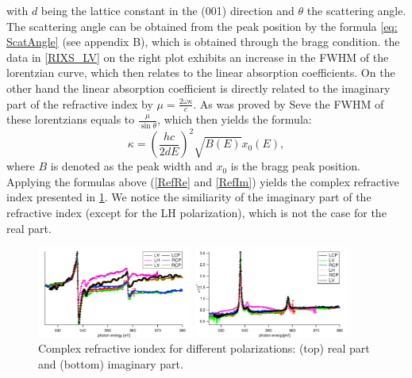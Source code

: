 \documentclass[twocolumn,amsmath,superscriptaddress,amssymb]{revtex4-1}
\begin{document}
\noindent with $d$ being the lattice constant in the (001) direction and $\theta$ the scattering angle. The scattering angle can be obtained from the peak position by the formula \ref{eq: ScatAngle} (see appendix B), which is obtained through the bragg condition. the data in \ref{RIXS_LV} on the right plot exhibits an increase in the FWHM of the lorentzian curve, which then relates to the linear absorption coefficients. On the other hand the linear absorption coefficient is directly related to the imaginary part of the refractive index by 
$\mu=\frac{2\omega\kappa}{c}$. As was proved by Seve \cite{Seve} the FWHM of these lorentzians equals to $\frac{\mu}{\sin\theta}$, which then yields the formula:
\begin{equation}\label{RefIm}
\kappa=\left(\frac{hc}{2dE}\right)^2\sqrt{B(E)}x_0(E),
\end{equation}
\noindent where $B$ is denoted as the peak width and $x_0$ is the bragg peak position.  Applying the formulas above (\ref{RefRe} and \ref{RefIm}) yields the complex refractive index presented in \ref{Refractive}. We notice the similiarity of the imaginary part of the refractive index (except for the LH polarization), which is not the case for the real part. 

\begin{figure}
	\begin{minipage}[t]{0.9\columnwidth}
		\includegraphics[width = \textwidth, height = 3cm]{RefIndRe.pdf}
	\end{minipage}
	\begin{minipage}[t]{0.9\columnwidth}
		\includegraphics[width = \textwidth, height = 3cm]{RefIndIm.pdf}
	\end{minipage}
	\label{Refractive}
\caption{Complex refractive iondex for different polarizations: (top) real part and (bottom) imaginary part.}
\end{figure}
%
\end{document}
